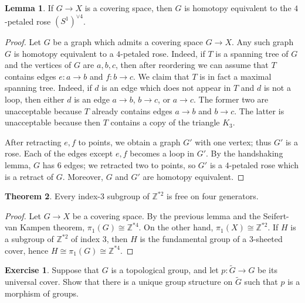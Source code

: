 \documentclass[10pt]{article}
\newcommand{\ZZ}{\mathbb{Z}}
\theoremstyle{definition}
\newtheorem{exer}{Exercise}
\newtheorem{lemma}{Lemma}[exer]
\newtheorem{theorem}[lemma]{Theorem}
\begin{document}
\begin{lemma}
If $G \to X$ is a covering space, then $G$ is homotopy equivalent to the $4$-petaled rose $(S^1)^{\vee 4}$.
\end{lemma}
\begin{proof}
Let $G$ be a graph which admits a covering space $G \to X$.
Any such graph $G$ is homotopy equivalent to a $4$-petaled rose.
Indeed, if $T$ is a spanning tree of $G$ and the vertices of $G$ are $a,b,c$, then after reordering we can assume that $T$ contains edges $e: a \to b$ and $f: b \to c$.
We claim that $T$ is in fact a maximal spanning tree.
Indeed, if $d$ is an edge which does not appear in $T$ and $d$ is not a loop, then either $d$ is an edge $a \to b$, $b \to c$, or $a \to c$.
The former two are unacceptable because $T$ already contains edges $a \to b$ and $b \to c$. The latter is unacceptable because then $T$ contains a copy of the triangle $K_3$.

After retracting $e,f$ to points, we obtain a graph $G'$ with one vertex; thus $G'$ is a rose.
Each of the edges except $e,f$ becomes a loop in $G'$.
By the handshaking lemma, $G$ has $6$ edges; we retracted two to points, so $G'$ is a $4$-petaled rose which is a retract of $G$.
Moreover, $G$ and $G'$ are homotopy equivalent.
\end{proof}

\begin{theorem}
Every index-$3$ subgroup of $\ZZ^{*2}$ is free on four generators.
\end{theorem}
\begin{proof}
Let $G \to X$ be a covering space.
By the previous lemma and the Seifert-van Kampen theorem, $\pi_1(G) \cong \ZZ^{*4}$.
On the other hand, $\pi_1(X) \cong \ZZ^{*2}$.
If $H$ is a subgroup of $\ZZ^{*2}$ of index $3$, then $H$ is the fundamental group of a $3$-sheeted cover, hence $H \cong \pi_1(G) \cong \ZZ^{*4}$.
\end{proof}

\begin{exer}
Suppose that $G$ is a topological group, and let $p: \widetilde G \to G$ be its universal cover.
Show that there is a unique group structure on $\widetilde G$ such that $p$ is a morphism of groups.
\end{exer}
\end{document}
